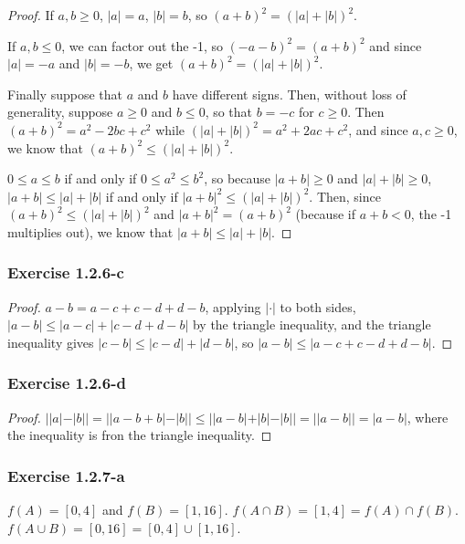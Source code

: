 \documentclass{article}
\begin{document}
\begin{proof}
If $a, b \geq 0$, $|a| = a$, $|b| = b$, so $(a + b)^2 = (|a| + |b|)^2$.

If $a, b \leq 0$, we can factor out the -1, so $(-a -b)^2 = (a + b)^2$ and since $|a| = -a$ and $|b| = -b$, we get $(a + b)^2 = (|a| + |b|)^2$.

Finally suppose that $a$ and $b$ have different signs. Then, without loss of generality, suppose $a \geq 0$ and $b \leq 0$, so that $b = -c$ for $c \geq 0$.
Then $(a + b)^2 = a^2 -2bc + c^2$ while $(|a| + |b|)^2 = a^2 + 2ac + c^2$, and since $a, c \geq 0$, we know that $(a + b)^2 \leq (|a| + |b|)^2$.

$0 \leq a \leq b$ if and only if $0 \leq a^2 \leq b^2$, so because $|a + b| \geq 0$ and $|a| + |b| \geq 0$,
$|a + b| \leq |a| + |b|$ if and only if $|a + b|^2 \leq (|a| + |b|)^2$.
Then, since $(a + b)^2 \leq (|a| + |b|)^2$ and $|a + b|^2 = (a + b)^2$ (because if $a + b < 0$, the -1 multiplies out), we know that $|a + b| \leq |a| + |b|$.

\end{proof}

\subsubsection*{Exercise 1.2.6-c}

\begin{proof}
$a - b = a - c + c - d + d - b$, applying $|\cdot|$ to both sides, $|a - b| \leq |a - c| + |c - d + d - b|$ by the triangle inequality, and the triangle
inequality gives $|c - b| \leq |c - d| + |d - b|$, so $|a - b| \leq |a - c + c - d + d - b|$.
\end{proof}

\subsubsection*{Exercise 1.2.6-d}

\begin{proof}
$||a| - |b|| = ||a - b + b| - |b|| \leq ||a - b| + |b| - |b|| = ||a - b|| = |a - b|$, where the inequality is fron the triangle inequality.
\end{proof}

\subsubsection*{Exercise 1.2.7-a}

$f(A) = [0, 4]$ and $f(B) = [1, 16]$. $f(A \cap B) = [1, 4] = f(A) \cap f(B)$. $f(A \cup B) = [0, 16] = [0, 4] \cup [1, 16]$.
\end{document}
